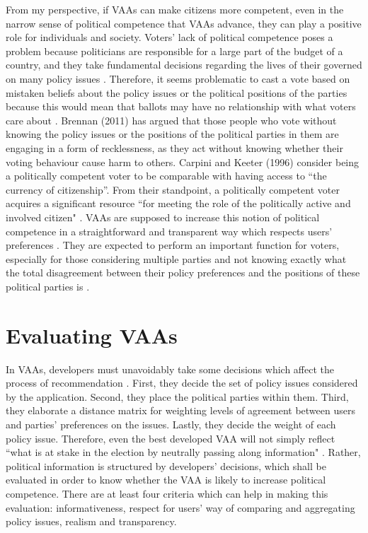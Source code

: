 \documentclass{scrartcl}
\begin{document}
From my perspective, if VAAs can make citizens more competent, even in the narrow sense of political competence that VAAs advance, they can play a positive role for individuals and society.  Voters' lack of political competence poses a problem because politicians are responsible for a large part of the budget of a country, and they take fundamental decisions regarding the lives of their governed on many policy issues \cite{somin1998voter}. Therefore, it seems problematic to cast a vote based on mistaken beliefs about the policy issues or the political positions of the parties because this would mean that ballots may have no relationship with what  voters care about \cite{Garzia2014}. Brennan (2011) has argued that those people who vote without knowing the policy issues or the positions of the political parties in them are engaging in a form of recklessness, as they act without knowing whether their voting behaviour cause harm to others. Carpini and Keeter (1996) consider being a politically competent voter to be comparable with having access to “the currency of citizenship”. From their standpoint, a politically competent voter acquires a significant resource ``for meeting the role of the politically active and involved citizen" \cite [8]{carpini1996americans}. VAAs are supposed to increase this notion of political competence in a straightforward and transparent way which respects users' preferences
\cite{marschall2014voting}. They are expected to perform an important function for voters, especially for those considering multiple parties and not knowing exactly what the total disagreement between their policy preferences and the positions of these political parties is \cite{garzia2017voting}.

\section{Evaluating VAAs}

In VAAs, developers must unavoidably take some decisions which affect the process of recommendation \cite{fossen2015electoral}. First, they decide the set of policy issues considered by the application. Second, they place the political parties within them. Third, they elaborate a distance matrix for weighting levels of agreement between users and parties' preferences on the issues. Lastly, they decide the weight of each policy issue. Therefore, even the best developed VAA will not simply reflect ``what is at stake in the election by neutrally passing along information" \cite [341]{fossen2015electoral}. Rather, political information is structured by developers’ decisions, which shall be evaluated in order to know whether the VAA is likely to increase political competence. There are at least four criteria which can help in making this evaluation: informativeness, respect for users' way of comparing and aggregating policy issues, realism and transparency. 
\end{document}
